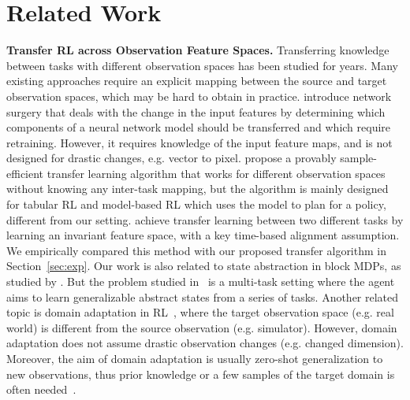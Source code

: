 \vspace{-0.5em}
\section{Related Work}
\label{sec:related}
\vspace{-0.5em}

\textbf{Transfer RL across Observation Feature Spaces.}
Transferring knowledge between tasks with different observation spaces has been studied for years. 
Many existing approaches\citep{taylor2007transfer,mann2013directed,brys2015policy} require an explicit mapping between the source and target observation spaces, which may be hard to obtain in practice.
\citet{raiman2019neural} introduce network surgery that deals with the change in the input features by determining which components of a neural network model should be transferred and which require retraining. However, it requires knowledge of the input feature maps, and is not designed for drastic changes, e.g. vector to pixel.
\citet{sun2020temple} propose a provably sample-efficient transfer learning algorithm that works for different observation spaces without knowing any inter-task mapping, but the algorithm is mainly designed for tabular RL and model-based RL which uses the model to plan for a policy, different from our setting.
\citet{gupta2017learning} achieve transfer learning between two different tasks by learning an invariant feature space, with a key time-based alignment assumption. We empirically compared this method with our proposed transfer algorithm in Section~\ref{sec:exp}.
Our work is also related to state abstraction in block MDPs, as studied by \citet{zhang2020invariant}. But the problem studied in~\citet{zhang2020invariant} is a multi-task setting where the agent aims to learn generalizable abstract states from a series of tasks.
Another related topic is domain adaptation in RL~\citep{higgins2017darla,eysenbach2020off,zhang2020learning}, where the target observation space (e.g. real world) is different from the source observation (e.g. simulator). However, domain adaptation does not assume drastic observation changes (e.g. changed dimension). Moreover, the aim of domain adaptation is usually zero-shot generalization to new observations, thus prior knowledge or a few samples of the target domain is often needed~\citep{eysenbach2020off}.


